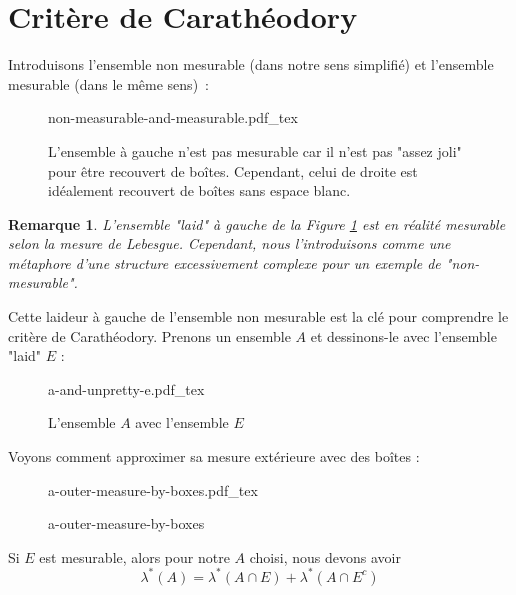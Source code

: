 \documentclass[a4paper]{article}
\newcommand{\incfig}[1]{%
    \def\svgwidth{\columnwidth}
    {#1.pdf_tex}
}
\newtheorem*{remark}{Remarque}
\begin{document}
\section{Critère de Carathéodory}%
Introduisons l'ensemble non mesurable (dans notre sens simplifié) et l'ensemble mesurable (dans le même sens) :%
\begin{figure}[H]
    \centering
    \incfig{non-measurable-and-measurable}
    \caption{L'ensemble à gauche n'est pas mesurable car il n'est pas "assez joli" pour être recouvert de boîtes. Cependant, celui de droite est idéalement recouvert de boîtes sans espace blanc.}
    \label{fig:non-measurable-and-measurable}
\end{figure}%
\begin{remark}
    L'ensemble "laid" à gauche de la Figure
    \ref{fig:non-measurable-and-measurable} est en réalité mesurable selon la mesure de Lebesgue. Cependant, nous l'introduisons comme une métaphore d'une structure excessivement complexe pour un exemple de "non-mesurable".
\end{remark}%
Cette laideur à gauche de l'ensemble non mesurable est la clé pour comprendre le critère de Carathéodory. Prenons un ensemble $A$ et dessinons-le avec l'ensemble "laid" $E$ :%
\begin{figure}[H]
    \centering
    \incfig{a-and-unpretty-e}
    \caption{L'ensemble $A$ avec l'ensemble $E$}
    \label{fig:a-and-unpretty-e}
\end{figure}%
Voyons comment approximer sa mesure extérieure avec des boîtes :%
\begin{figure}[H]
    \centering
    \incfig{a-outer-measure-by-boxes}
    \caption{a-outer-measure-by-boxes}
    \label{fig:a-outer-measure-by-boxes}
\end{figure}%
Si $E$ est mesurable, alors pour notre $A$ choisi, nous devons avoir
 \[
\lambda^*(A) = \lambda^*(A \cap E) + \lambda^*(A \cap E^c)
\] 
\end{document}
